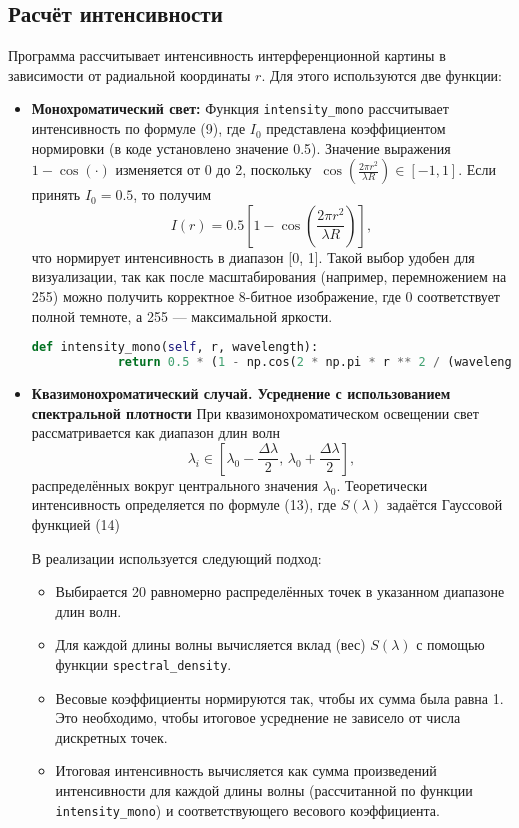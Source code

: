 \documentclass[a4paper,11pt]{article}
\theoremstyle{definition}
\begin{document}
    \subsection{Расчёт интенсивности}
    Программа рассчитывает интенсивность интерференционной картины в зависимости от радиальной координаты \( r \).
    Для этого используются две функции:
    \begin{itemize}
        \item \textbf{Монохроматический свет:} Функция \texttt{intensity\_mono} рассчитывает интенсивность
        по формуле (9), где \(I_0\) представлена коэффициентом нормировки (в коде установлено значение 0.5).
        Значение выражения \(1 - \cos(\cdot)\) изменяется от 0 до 2, поскольку
        \(\
            \cos\left(\frac{2\pi r^2}{\lambda R}\right) \in [-1, 1].
        \)
        Если принять \(I_0 = 0.5\), то получим
        \[
            I(r) = 0.5\left[1 - \cos\left(\frac{2\pi r^2}{\lambda R}\right)\right],
        \]
        что нормирует интенсивность в диапазон [0, 1]. Такой выбор удобен для визуализации, так как после масштабирования
        (например, перемножением на 255) можно получить корректное 8-битное изображение, где 0 соответствует полной
        темноте, а 255 --- максимальной яркости.

        \begin{lstlisting}[language=Python]
        def intensity_mono(self, r, wavelength):
            return 0.5 * (1 - np.cos(2 * np.pi * r ** 2 / (wavelength * self.R)))
        \end{lstlisting}

        \item{\textbf{Квазимонохроматический случай. Усреднение с использованием спектральной плотности}}
        При квазимонохроматическом освещении свет рассматривается как диапазон длин волн
        \[
        \lambda_i \in \left[\lambda_0 - \frac{\Delta\lambda}{2}, \, \lambda_0 + \frac{\Delta\lambda}{2}\right],
        \]
        распределённых вокруг центрального значения \(\lambda_0\). Теоретически интенсивность
        определяется по формуле (13), где \(S(\lambda)\) задаётся Гауссовой функцией (14)

        В реализации используется следующий подход:
        \begin{itemize}
            \item Выбирается 20 равномерно распределённых точек в указанном диапазоне длин волн.
            \item Для каждой длины волны вычисляется вклад (вес) \( S(\lambda) \) с помощью функции
            \texttt{spectral\_density}.
            \item Весовые коэффициенты нормируются так, чтобы их сумма была равна 1. Это необходимо,
            чтобы итоговое усреднение не зависело от числа дискретных точек.
            \item Итоговая интенсивность вычисляется как сумма произведений интенсивности для каждой длины
            волны (рассчитанной по функции \texttt{intensity\_mono}) и соответствующего весового коэффициента.
        \end{itemize}


\end{itemize}
\end{document}
